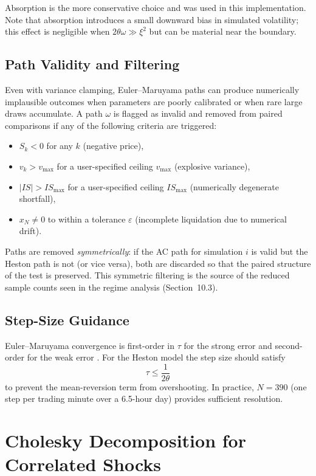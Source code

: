 \documentclass[11pt]{article}
\begin{document}
Absorption is the more conservative choice and was used in this implementation. Note that absorption introduces a small downward bias in simulated volatility; this effect is negligible when $2\theta\omega \gg \xi^2$ but can be material near the boundary.

\subsection{Path Validity and Filtering}

Even with variance clamping, Euler--Maruyama paths can produce numerically implausible outcomes when parameters are poorly calibrated or when rare large draws accumulate. A path $\omega$ is flagged as invalid and removed from paired comparisons if any of the following criteria are triggered:

\begin{itemize}
\item $S_k < 0$ for any $k$ (negative price),
\item $v_k > v_{\max}$ for a user-specified ceiling $v_{\max}$ (explosive variance),
\item $|IS| > IS_{\max}$ for a user-specified ceiling $IS_{\max}$ (numerically degenerate shortfall),
\item $x_N \neq 0$ to within a tolerance $\varepsilon$ (incomplete liquidation due to numerical drift).
\end{itemize}

Paths are removed \emph{symmetrically}: if the AC path for simulation $i$ is valid but the Heston path is not (or vice versa), both are discarded so that the paired structure of the test is preserved. This symmetric filtering is the source of the reduced sample counts seen in the regime analysis (Section~10.3).

\subsection{Step-Size Guidance}

Euler--Maruyama convergence is first-order in $\tau$ for the strong error and second-order for the weak error \cite{kloeden1992numerical}. For the Heston model the step size should satisfy
\[
\tau \leq \frac{1}{2\theta}
\]
to prevent the mean-reversion term from overshooting. In practice, $N = 390$ (one step per trading minute over a 6.5-hour day) provides sufficient resolution.

\section{Cholesky Decomposition for Correlated Shocks}
\label{app:cholesky}
\end{document}
